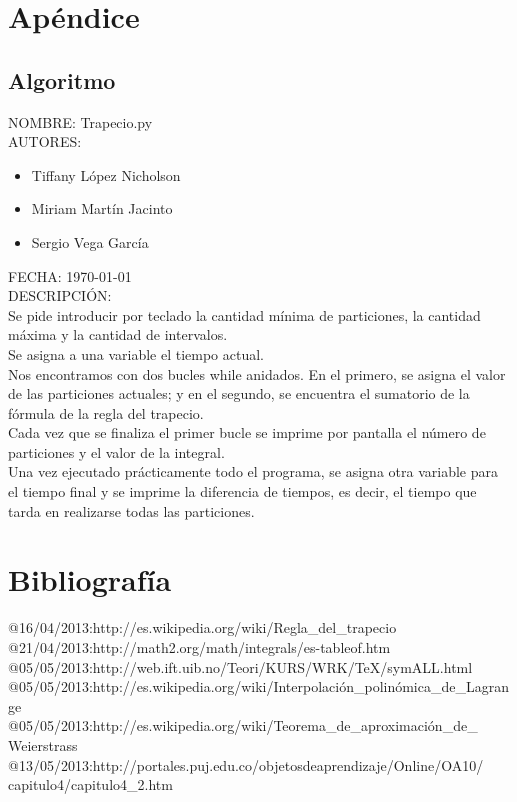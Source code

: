 \documentclass{article}
\begin{document}
   \pagebreak

   \section{Apéndice}
    \subsection{Algoritmo}
   NOMBRE: Trapecio.py\\
   
   AUTORES:

   \begin{itemize}
     \item Tiffany López Nicholson
     \item Miriam Martín Jacinto
     \item Sergio Vega García
   \end{itemize}

   FECHA: \today \\

   DESCRIPCIÓN:\\

     Se pide introducir por teclado la cantidad mínima de particiones, la cantidad máxima y la cantidad de intervalos.\\
	
	Se asigna a una variable el tiempo actual.\\

	Nos encontramos con dos bucles while anidados. En el primero, se asigna el valor de las particiones actuales; y en el segundo, se encuentra el sumatorio de la fórmula de la regla del trapecio.\\

     Cada vez que se finaliza el primer bucle se imprime por pantalla el número de particiones y el valor de la integral.\\

	Una vez ejecutado prácticamente todo el programa, se asigna otra variable para el tiempo final y se imprime la diferencia de tiempos, es decir, el tiempo que tarda en realizarse todas las particiones.\\

  \pagebreak


	\section{Bibliografía}
		\begin{thebibliography}{99}
		@{16/04/2013:{http://es.wikipedia.org/wiki/Regla\_del\_trapecio}}
		@{21/04/2013:{http://math2.org/math/integrals/es-tableof.htm}}
		@{05/05/2013:{http://web.ift.uib.no/Teori/KURS/WRK/TeX/symALL.html}}
		@{05/05/2013:{http://es.wikipedia.org/wiki/Interpolación\_polinómica\_de\_Lagrange}}\\
		@{05/05/2013:{http://es.wikipedia.org/wiki/Teorema\_de\_aproximación\_de\_
Weierstrass}}
		@{13/05/2013:{http://portales.puj.edu.co/objetosdeaprendizaje/Online/OA10/
capitulo4/capitulo4\_2.htm}}
 		 \end{thebibliography}
   
\end{document}
